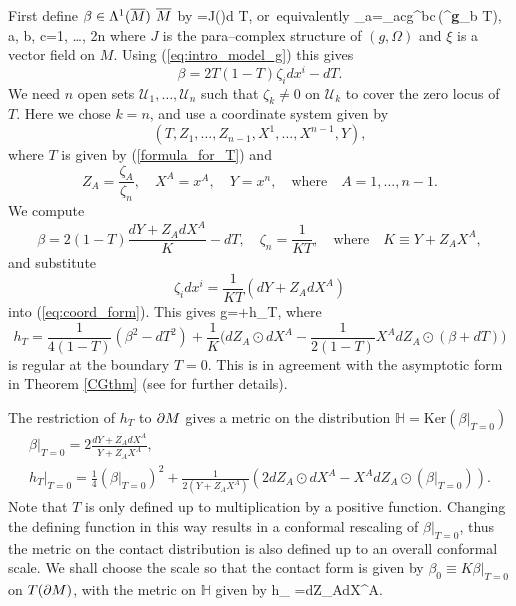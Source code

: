 First define $\beta\in \Lambda^1(\overline{M})$ $\overline{M}$
by 
\be
\label{def_theta}
\xi\hook \beta=J(\xi)\hook d T, \quad\mbox{or equivalently}\quad 
\beta_a=\Omega_{ac}g^{bc}\,({{^{\bf g}\nabla}}_b T), \quad a, b, c=1, \dots, 2n
\ee
where $J$ is the para--complex structure of $(g,  \Omega)$ and $\xi$ is a vector field on $M$. Using (\ref{eq:intro_model_g}) this  gives
\[
\beta=2T(1-T)\zeta_id x^i-dT.
\]
We need $n$  open sets $\mathcal{U}_1, \dots, \mathcal{U}_n$ such that $\zeta_k\neq 0$ on $\mathcal{U}_k$
to cover the zero locus of $T$. Here we chose $k=n$, and use
a coordinate system given by
\[
(T, Z_1, \dots, Z_{n-1}, X^1, \dots,
 X^{n-1}, Y),
\] 
where $T$ is
given by (\ref{formula_for_T}) and
\[
Z_A=\frac {\zeta_A}{\zeta_n}, \quad X^A=x^A, \quad Y=x^{n}, \quad\mbox{where}\quad
A=1, \dots, n-1.
\]
We compute
\[
\beta=2(1-T)\frac{dY+Z_AdX^A}{K}-dT, \quad
\zeta_n=\frac{1}{KT}, \quad \mbox{where}\quad K\equiv Y+Z_AX^A,
\]
and substitute
\[
\zeta_i dx^i=\frac{1}{KT}(dY+Z_AdX^A)
\]
into (\ref{eq:coord_form}). This gives
\be
\label{CG_Form}
g=+h_T,
\ee
where 
\[
h_T=\frac{1}{4(1-T)}(\beta^2-dT^2)+\frac{1}{K}\Big(dZ_A\odot dX^A-\frac{1}{2(1-T)}X^A dZ_A\odot(\beta+dT)\Big)
\]
is regular at the boundary $T=0$. This is in agreement with the 
asymptotic form in Theorem \ref{CGthm} (see \cite{CG} for further details).

The restriction of $h_T$ to $\partial M$ gives a metric on the distribution ${ \mathbb{H} }=\mbox{Ker} (\beta|_{T=0})$
\begin{gather}
\beta|_{T=0}=2\frac{dY+Z_A dX^A}{Y+Z_AX^A}, \nonumber \\
h_T|_{T=0}=\frac{1}{4}{(\beta|_{T=0})}^2+\frac{1}{2(Y+Z_AX^A)}(2dZ_A\odot dX^A-X^AdZ_A\odot(\beta|_{T=0})). \label{h000}
\end{gather}
 Note that $T$ is only defined up to multiplication by a positive function. Changing the defining function in this way results in a conformal rescaling of $\beta|_{T=0}$, thus the metric on the contact distribution is also defined up to an overall conformal scale. We shall choose the scale so that
the contact form is given  by $\beta_0\equiv K\beta|_{T=0}$ on $T(\partial M)$,
with the metric on ${ \mathbb{H} }$ given by
\be
\label{on_distri}
h_{  }=dZ_A\odot dX^A.
\ee

